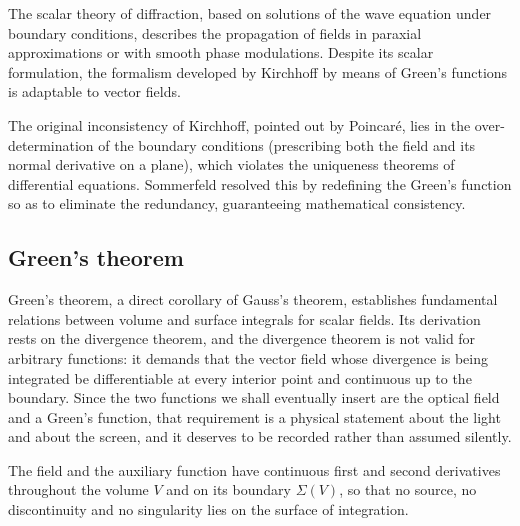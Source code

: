 	The scalar theory of diffraction, based on solutions of the wave equation under boundary conditions, describes the propagation of fields in paraxial approximations or with smooth phase modulations. Despite its scalar formulation, the formalism developed by Kirchhoff by means of Green's functions is adaptable to vector fields.

	The original inconsistency of Kirchhoff, pointed out by Poincaré, lies in the over-determination of the boundary conditions (prescribing both the field and its normal derivative on a plane), which violates the uniqueness theorems of differential equations. Sommerfeld resolved this by redefining the Green's function so as to eliminate the redundancy, guaranteeing mathematical consistency.

	\subsection{Green's theorem}

		Green's theorem, a direct corollary of Gauss's theorem, establishes fundamental relations between volume and surface integrals for scalar fields. Its derivation rests on the divergence theorem, and the divergence theorem is not valid for arbitrary functions: it demands that the vector field whose divergence is being integrated be differentiable at every interior point and continuous up to the boundary. Since the two functions we shall eventually insert are the optical field and a Green's function, that requirement is a physical statement about the light and about the screen, and it deserves to be recorded rather than assumed silently.

		\begin{Assumption}
			The field and the auxiliary function have continuous first and second derivatives throughout the volume $V$ and on its boundary $\Sigma(V)$, so that no source, no discontinuity and no singularity lies on the surface of integration.
		\end{Assumption}


